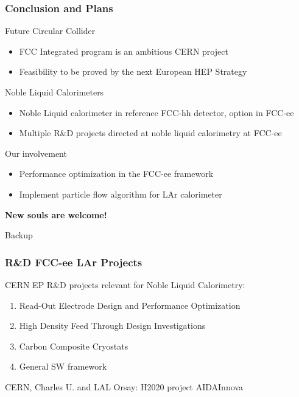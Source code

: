 \documentclass[aspectratio=169]{beamer}
\newcommand{\backupbegin}{%
   \newcounter{finalframe}
   \setcounter{finalframe}{\value{framenumber}}
}
\newcommand{\bluetext}[1]{%
  \textcolor{myBlue}{#1}
}
\newcommand{\redtext}[1]{%
  \textcolor{myRed}{#1}
}
\begin{document}
\begin{frame}
  \frametitle{Conclusion and Plans}

  \bluetext{Future Circular Collider}
  \begin{itemize}
    \item FCC Integrated program is an ambitious CERN project
    \item Feasibility to be proved by the next European HEP Strategy
  \end{itemize}

  \bluetext{Noble Liquid Calorimeters}
  \begin{itemize}
    \item Noble Liquid calorimeter in reference FCC-hh detector, option in
          FCC-ee
    \item Multiple R\&D projects directed at noble liquid  calorimetry at FCC-ee
  \end{itemize}

  \bluetext{Our involvement}
  \begin{itemize}
    \item Performance optimization in the FCC-ee framework
    \item Implement particle flow algorithm for LAr calorimeter
  \end{itemize}

  \begin{center}
    \bluetext{\bf New souls are welcome!}
  \end{center}
\end{frame}

%
%
\appendix
\backupbegin{}

\begin{frame}[c]
  \begin{center}
    \redtext{\Huge Backup}
  \end{center}
\end{frame}


\begin{frame}
  \frametitle{R\&D FCC-ee LAr Projects}

  CERN EP R\&D projects relevant for Noble Liquid Calorimetry:

  \begin{enumerate}
    \item Read-Out Electrode Design and Performance Optimization
    \item High Density Feed Through Design Investigations
    \item Carbon Composite Cryostats
    \item General SW framework
  \end{enumerate}

  CERN, Charles U. and LAL Orsay: H2020 project AIDAInnova

\end{frame}
\end{document}

